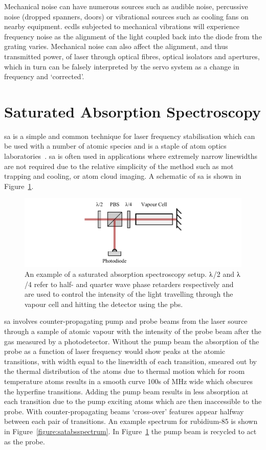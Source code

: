 Mechanical noise can have numerous sources such as audible noise, percussive noise (dropped spanners, doors) or vibrational sources such as cooling fans on nearby equipment.
\Glspl{ecdl} subjected to mechanical vibrations will experience frequency noise as the alignment of the light coupled back into the diode from the grating varies.
Mechanical noise can also affect the alignment, and thus transmitted power, of laser through optical fibres, optical isolators and apertures, which in turn can be falsely interpreted by the servo system as a change in frequency and `corrected'.

\section{Saturated Absorption Spectroscopy}
\Gls{sa} is a simple and common technique for laser frequency stabilisation which can be used with a number of atomic species and is a staple of atom optics laboratories~\cite{demtroder_laser_2003}.
\Gls{sa} is often used in applications where extremely narrow linewidths are not required due to the relative simplicity of the method such as \gls{mot} trapping and cooling, or atom cloud imaging.
A schematic of \gls{sa} is shown in Figure~\ref{figure:satabs}.

\begin{figure}
\center
\includegraphics{part1/Figs/SatAbs.pdf}
\caption[Saturated absorption spectroscopy setup.]{An example of a saturated absorption spectroscopy setup. $\lambdaup$/2 and $\lambdaup$/4 refer to half- and quarter wave phase retarders respectively and are used to control the intensity of the light travelling through the vapour cell and hitting the detector using the \gls{pbs}.}
\label{figure:satabs}
\end{figure}

\Gls{sa} involves counter-propagating pump and probe beams from the laser source through a sample of atomic vapour with the intensity of the probe beam after the gas measured by a photodetector.
Without the pump beam the absorption of the probe as a function of laser frequency would show peaks at the atomic transitions, with width equal to the linewidth of each transition, smeared out by the thermal distribution of the atoms due to thermal motion which for room temperature atoms results in a smooth curve 100s of MHz wide which obscures the hyperfine transitions.
Adding the pump beam results in less absorption at each transition due to the pump exciting atoms which are then inaccessible to the probe. With counter-propagating beams `cross-over' features appear halfway between each pair of transitions.
An example spectrum for rubidium-85 is shown in Figure~\ref{figure:satabsspectrum}.
In Figure~\ref{figure:satabs} the pump beam is recycled to act as the probe.


